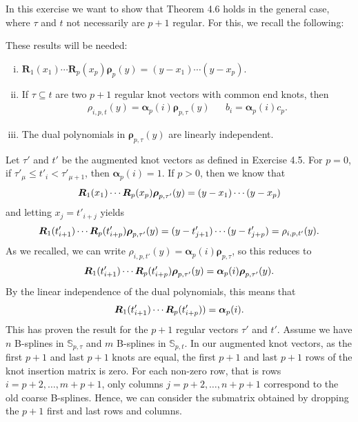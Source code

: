 \documentclass{article}
\renewcommand{\S}{\mathbb{S}}
\newcommand{\R}{\boldsymbol{R}}
\newcommand{\rrho}{\boldsymbol{\rho}}
\newcommand{\aalpha}{\boldsymbol{\alpha}}
\begin{document}
    In this exercise we want to show that Theorem 4.6 holds in the general
    case, where $\tau$ and $t$ not necessarily are $p+1$ regular. For this, we
    recall the following:
    \begin{recall}
        These results will be needed:     
        \begin{enumerate}[i)]
            \item $\R_1(x_1)\cdots\R_p(x_p)\rrho_p(y) = (y - x_1)\cdots(y-x_p)$.
            \item If $\tau \subseteq t$ are two $p+1$ regular knot vectors with common end knots, then
                \begin{align*}
                    \rho_{i, p, t}(y) = \aalpha_p(i)\rrho_{p, \tau}(y) && b_i = \aalpha_p(i)c_p.
                \end{align*}
            \item The dual polynomials in $\rrho_{p, \tau}(y)$ are linearly
                independent.
        \end{enumerate} 
    \end{recall}
    Let $\tau'$ and $t'$ be the augmented knot vectors as defined in Exercise
    4.5. For $p = 0$, if $\tau'_\mu \leq t'_i < \tau'_{\mu+1}$, then
    $\aalpha_{p}(i) = 1$. If $p > 0$, then we know that
    \begin{equation}
        \notag
        \R_1(x_1)\cdots\R_p(x_p)\rrho_{p, \tau'}(y) = (y - x_1)\cdots(y-x_p)
    \end{equation}
    and letting $x_j = t'_{i+j}$ yields
    \begin{equation}
        \notag
        \R_1(t'_{i+1}) \cdots \R_p(t'_{i+p})\rrho_{p, \tau'}(y) = (y -
        t'_{j+1}) \cdots (y - t'_{j+p}) = \rho_{i, p, t'}(y).
    \end{equation}
    As we recalled, we can write $\rho_{i, p, t'}(y) = \aalpha_p(i)\rrho_{p,
    \tau}$, so this reduces to
    \begin{equation}
        \notag
        \R_1(t'_{i+1}) \cdots \R_p(t'_{i+p})\rrho_{p, \tau'}(y)
        =\aalpha_p(i)\rrho_{p, \tau'}(y).
    \end{equation}
    By the linear independence of the dual polynomials, this means that
    \begin{equation}
        \notag
        \R_1(t'_{i+1}) \cdots \R_p(t'_{i+p})) = \aalpha_p(i).
    \end{equation}
    This has proven the result for the $p+1$ regular vectors $\tau'$ and $t'$.
    Assume we have $n$ B-splines in $\S_{p, \tau}$ and $m$ B-splines in $\S_{p,
    t}$. In our augmented knot vectors, as the first $p+1$ and last $p+1$ knots
    are equal, the first $p+1$ and last $p+1$ rows of the knot insertion matrix
    is zero. For each non-zero row, that is rows $i = p+2, \ldots, m+p+1$, only
    columns $j = p+2, \ldots, n+p+1$ correspond to the old coarse B-splines.
    Hence, we can consider the submatrix obtained by dropping the $p+1$ first
    and last rows and columns.
\end{document}
